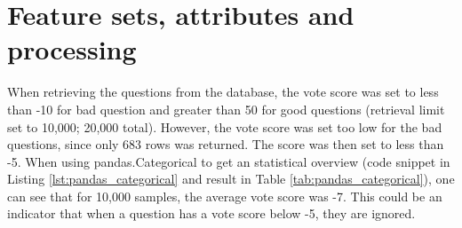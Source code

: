 \begin{comment}
		11. Stemming of data, model creation and gridsearch with SGD			
		12. Model based on 20,000 samples (10k good, 10k bad) - took approx ~3hours for both models
			Model 1 was for all data (no test set). Model 2 was based on train\_test\_split
		13. Added tags column to the used dataset. Added the unprocessed dataset (but html is removed)
		14. Tested out different SVM algorithms (SVC, SGD and LinearSVC)
			Issue was that I managed to overwrite the .csv, so I had to do everything over again
			took approximately 24-36 hours to complete (+ 3days before hand to make everything run smoothly).
		15. Attempted to use optparse, argparse to make it executable. 
			Problem is that it exits after command is run. Need it to continue running to be able to:
				a) create new (or load existing) model
				b) use model from a) to predict quality of entered question (rinse/repeat)
		16. Used while loop instead (loop until exit entered). shortcuts are the same as with argparse, but 
			without the '-' in front (e.g. instead of -e, just press 'e' to exit)
			
		Additional Notes (which might be relevant for the next section):
		
			- issues with setting up environment, installations, etc
			- switching from "good"/"bad" to +/-1 for class label (bcz libsvm)
			- switching from -10/+50 to -5/+50 to get more separation (and more results for bad)
			
		Potentially useful links:
		
		http://billchambers.me/tutorials/2015/01/14/python-nlp-cheatsheet-nltk-scikit-learn.html
		http://stackoverflow.com/questions/28064634/random-state-pseudo-random-numberin-scikit-learn
		http://stackoverflow.com/questions/35382657/my-pipeline-configuration-for-text-classification-using-
		sklearn-in-python
\end{comment}

\section{Feature sets, attributes and processing}
\label{sec:feature_sets}
When retrieving the questions from the database, the vote score was set to less than -10 for bad question 
and greater than 50 for good questions (retrieval limit set to 10,000; 20,000 total). However, the vote score 
was set too low for the bad questions, since only 683 rows was returned. The score was then set to less than 
-5. When using pandas.Categorical to get an statistical overview (code snippet in Listing 
\ref{lst:pandas_categorical} and result in Table \ref{tab:pandas_categorical}), one can see that for 10,000 
samples, the average vote score was -7. This could be an indicator that when a question has a vote score below 
-5, they are ignored.

